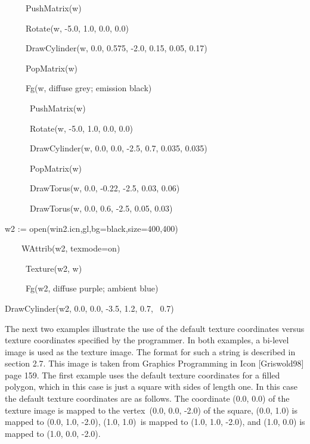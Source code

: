 \documentclass[letterpaper]{article}
\begin{document}
{{\sffamily
\ \ \ \ \ PushMatrix(w)}

{\sffamily
\ \ \ \ \ Rotate(w, -5.0, 1.0, 0.0, 0.0)}

{\sffamily
\ \ \ \ \ DrawCylinder(w, 0.0, 0.575, -2.0, 0.15, 0.05, 0.17)}

{\sffamily
\ \ \ \ \ PopMatrix(w) \ }

{\sffamily
\ \ \ \ \ Fg(w, {\textquotedbl}diffuse grey; emission black{\textquotedbl})}

{\sffamily
\ \ \ \ \ \ PushMatrix(w)}

{\sffamily
\ \ \ \ \ \ Rotate(w, -5.0, 1.0, 0.0, 0.0)}

{\sffamily
\ \ \ \ \ \ DrawCylinder(w, 0.0, 0.0, -2.5, 0.7, 0.035, 0.035)}

{\sffamily
\ \ \ \ \ \ PopMatrix(w) \ \ \ \ \ \ \ }

{\sffamily
\ \ \ \ \ \ DrawTorus(w, 0.0, -0.22, -2.5, 0.03, 0.06)}

{\sffamily
\ \ \ \ \ \ DrawTorus(w, 0.0, 0.6, -2.5, 0.05, 0.03)}


\bigskip

{\sffamily
w2 :=
open({\textquotedbl}win2.icn{\textquotedbl},{\textquotedbl}gl{\textquotedbl},{\textquotedbl}bg=black{\textquotedbl},{\textquotedbl}size=400,400{\textquotedbl})}

{\sffamily
\ \ \ \ WAttrib(w2, {\textquotedbl}texmode=on{\textquotedbl})}

{\sffamily
\ \ \ \ \ Texture(w2, w) }

{\sffamily
\ \ \ \ \ Fg(w2, {\textquotedbl}diffuse purple; ambient blue{\textquotedbl}) }

{\sffamily
DrawCylinder(w2, 0.0, 0.0, -3.5, 1.2, 0.7, \ 0.7)}


\bigskip

{
The next two examples illustrate the use of the default texture coordinates versus texture coordinates specified by the
programmer. In both examples, a bi-level image is used as the texture image. The format for such a string is described
in section 2.7. This image is taken from Graphics Programming in Icon [Griswold98] page 159. The first example uses the
default texture coordinates for a filled polygon, which in this case is just a square with sides of length one. In this
case the default texture coordinates are as follows. The coordinate \textsf{(0.0, 0.0) }of the texture image is mapped
to the vertex\texttt{ }\textsf{(0.0, 0.0, -2.0)} of the square, \textsf{(0.0, 1.0) }is mapped to \textsf{(0.0, 1.0,
-2.0), (1.0, 1.0)}\texttt{ }is mapped to \textsf{(1.0, 1.0, -2.0)}, and \textsf{(1.0, 0.0) }is mapped to \textsf{(1.0,
0.0, -2.0)}.}


}
\end{document}
